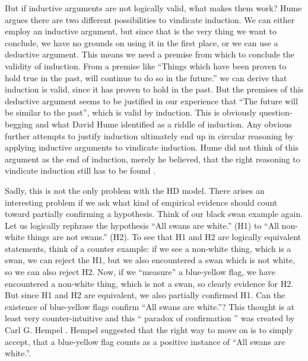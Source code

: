 But if inductive arguments are not logically valid, what makes them work?
Hume argues there are two different possibilities to vindicate induction.
We can either employ an inductive argument, but since that is
the very thing we want to conclude, we have no grounds on
using it in the first place, or we can use a deductive argument.
This means we need a premise from which to conclude the
validity of induction.
From a premise like \enquote{Things which have been proven to hold true in
    the past, will continue to do so in the future.} we can derive
that induction is valid, since it has proven to hold in the past.
But the premises of this deductive argument
seems to be justified in our experience that
\enquote{The future will be similar to the past}, which is
valid by induction.
This is obviously question-begging and what
David Hume identified as a riddle of induction.
Any obvious further attempts to justify induction
ultimately end up in circular reasoning by applying inductive arguments to
vindicate induction.
Hume did not think of this argument as the end of induction, merely
he believed, that the right reasoning to vindicate induction
still has to be found \cite[173]{philsciencebook}.

Sadly, this is not the only problem with the HD model.
There arises an interesting problem if we ask what kind of empirical evidence
should count toward partially confirming a hypothesis.
Think of our black swan example again. Let us logically rephrase
the hypothesis \enquote{All swans are white.} (H1)
to \enquote{All non-white things are not swans.} (H2).
To see that H1 and H2 are logically equivalent statements, think of a counter example:
if we see a non-white thing, which is a swan, we can reject the H1, but
we also encountered a swan which is not white, so we can also reject H2.
Now, if we \enquote{measure} a blue-yellow flag, we have encountered a
non-white thing, which is not a swan, so clearly evidence for H2.
But since H1 and H2 are equivalent, we also partially confirmed H1.
Can the existence of blue-yellow flags confirm \enquote{All swans are white.}?
This thought is at least very counter-intuitive and this \enquote{
    paradox of confirmation
} was created by Carl G. Hempel \cite[193]{philsciencebook}.
Hempel suggested that the right way to move on is to simply
accept, that a blue-yellow flag counts as a positive instance of
\enquote{All swans are white.}.

